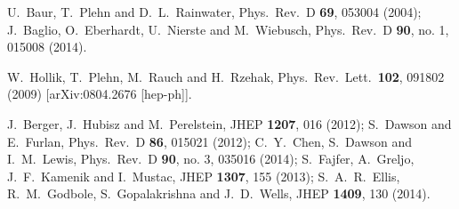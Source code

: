   U.~Baur, T.~Plehn and D.~L.~Rainwater,
  Phys.\ Rev.\ D {\bf 69}, 053004 (2004);
  J.~Baglio, O.~Eberhardt, U.~Nierste and M.~Wiebusch,
  Phys.\ Rev.\ D {\bf 90}, no. 1, 015008 (2014).

  W.~Hollik, T.~Plehn, M.~Rauch and H.~Rzehak,
  Phys.\ Rev.\ Lett.\  {\bf 102}, 091802 (2009)
  [arXiv:0804.2676 [hep-ph]].

  J.~Berger, J.~Hubisz and M.~Perelstein,
  JHEP {\bf 1207}, 016 (2012);
  S.~Dawson and E.~Furlan,
  Phys.\ Rev.\ D {\bf 86}, 015021 (2012);
  C.~Y.~Chen, S.~Dawson and I.~M.~Lewis,
  Phys.\ Rev.\ D {\bf 90}, no. 3, 035016 (2014);
  S.~Fajfer, A.~Greljo, J.~F.~Kamenik and I.~Mustac,
  JHEP {\bf 1307}, 155 (2013);
  S.~A.~R.~Ellis, R.~M.~Godbole, S.~Gopalakrishna and J.~D.~Wells,
  JHEP {\bf 1409}, 130 (2014).

